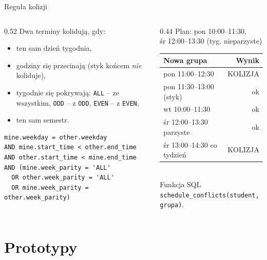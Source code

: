 \documentclass[aspectratio=169,11pt]{beamer}
\newcommand{\good}[1]{\textcolor{ok}{#1}}
\newcommand{\bad}[1]{\textcolor{bad}{#1}}
\begin{document}
\begin{frame}[fragile]{Reguła kolizji}
  \begin{columns}[T]
    \begin{column}{0.52\textwidth}
      \small
      Dwa terminy kolidują, gdy:
      \begin{itemize}
        \item ten sam dzień tygodnia,
        \item godziny się przecinają (styk końcem \emph{nie} koliduje),
        \item tygodnie się pokrywają: \texttt{ALL} -- ze wszystkim, \texttt{ODD} -- z \texttt{ODD}, \texttt{EVEN} -- z \texttt{EVEN},
        \item ten sam semestr.
      \end{itemize}
\begin{lstlisting}[basicstyle=\ttfamily\scriptsize]
mine.weekday = other.weekday
AND mine.start_time < other.end_time
AND other.start_time < mine.end_time
AND (mine.week_parity = 'ALL'
  OR other.week_parity = 'ALL'
  OR mine.week_parity = other.week_parity)
\end{lstlisting}
    \end{column}
    \begin{column}{0.44\textwidth}
      \small
      Plan: pon 10:00--11:30,\\ śr 12:00--13:30 (tyg. nieparzyste)\\[4pt]
      \begin{tabular}{@{}lr@{}}
        \toprule
        \textbf{Nowa grupa} & \textbf{Wynik} \\
        \midrule
        pon 11:00--12:30 & \bad{KOLIZJA} \\
        pon 11:30--13:00 (styk) & \good{ok} \\
        wt 10:00--11:30 & \good{ok} \\
        śr 12:00--13:30 parzyste & \good{ok} \\
        śr 13:00--14:30 co tydzień & \bad{KOLIZJA} \\
        \bottomrule
      \end{tabular}\\[4pt]
      \footnotesize Funkcja SQL \texttt{schedule\_conflicts(student, grupa)}.
    \end{column}
  \end{columns}
\end{frame}

\section{Prototypy}
\end{document}
